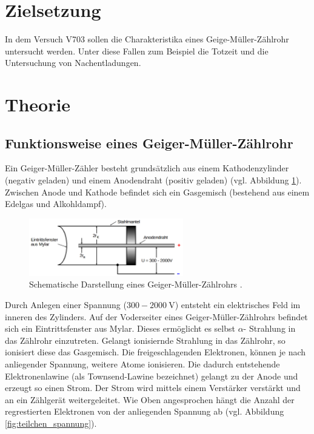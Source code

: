 \setcounter{page}{1}
\section*{Zielsetzung}

In dem Versuch V703 sollen die Charakteristika eines
Geige-Müller-Zählrohr untersucht werden.
Unter diese Fallen zum Beispiel die
Totzeit und die Untersuchung von Nachentladungen.

\section{Theorie}

\subsection{Funktionsweise eines Geiger-Müller-Zählrohr}
Ein Geiger-Müller-Zähler besteht grundsätzlich aus einem
Kathodenzylinder (negativ geladen) und einem Anodendraht (positiv geladen) (vgl. Abbildung \ref{fig: schematischer_aufbau}).
Zwischen Anode und Kathode befindet sich ein Gasgemisch (bestehend aus einem Edelgas
und Alkohldampf).
\begin{figure}
  \centering
  \includegraphics[width=0.6\textwidth]{bilder/geiger_.png}
  \caption{Schematische Darstellung eines Geiger-Müller-Zählrohrs \cite{anleitung703}.}
  \label{fig: schematischer_aufbau}
  \end{figure}
Durch Anlegen einer Spannung ($300-\SI{2000}{\volt}$) entsteht ein elektrisches
Feld im inneren des Zylinders. Auf der Voderseiter eines Geiger-Müller-Zählrohrs
befindet sich ein Eintrittsfenster aus Mylar. Dieses ermöglicht es selbst $\alpha$-
Strahlung in das Zählrohr einzutreten. Gelangt ionisiernde Strahlung
in das Zählrohr, so ionisiert diese das Gasgemisch. Die freigeschlagenden
Elektronen, können je nach anliegender Spannung, weitere Atome ionisieren.
Die dadurch entstehende Elektronenlawine (als Townsend-Lawine bezeichnet) gelangt zu der Anode und erzeugt so
einen Strom. Der Strom wird mittels einem Verstärker verstärkt und an ein
Zählgerät weitergeleitet. Wie Oben angesprochen hängt die Anzahl der regrestierten
Elektronen von der anliegenden Spannung ab (vgl. Abbildung \ref{fig:teilchen_spannung}).
